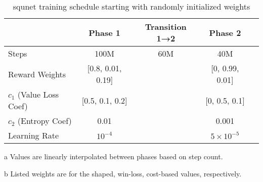 \documentclass[conference]{IEEEtran}
\newcounter{supptable}
\newenvironment{supptable}
  {\renewcommand{\tablename}{Supplemental Table}\setcounter{table}{\value{supptable}}\addtocounter{supptable}{1}\begin{table}}
  {\end{table}\setcounter{supptable}{\value{table}}}
\begin{document}
\begin{supptable}[H]
    \centering
    \begin{threeparttable}
    \caption{squnet training schedule starting with randomly initialized weights}
    \label{tab:squnet-training-schedule}
    \begin{tabular}{lcccc}
    \toprule
     & Phase 1 & Transition 1→2\tnote{a} & Phase 2 \\
     \midrule
    Steps & 100M & 60M & 40M \\
    Reward Weights\tnote{b} & [0.8, 0.01, 0.19] &  & [0, 0.99, 0.01] \\
    $c_1$ (Value Loss Coef)\tnote{b} & [0.5, 0.1, 0.2] &  & [0, 0.5, 0.1]\\
    $c_2$ (Entropy Coef) & 0.01 & & 0.001 \\
    Learning Rate & $10^{-4}$ & & $5 \times 10^{-5}$ \\
    \bottomrule
    \end{tabular}
    \begin{tablenotes}
       \item[a] Values are linearly interpolated between phases based on step count.
       \item[b] Listed weights are for the shaped, win-loss, cost-based values, respectively.
    \end{tablenotes}
    \end{threeparttable}
\end{supptable}
\end{document}
